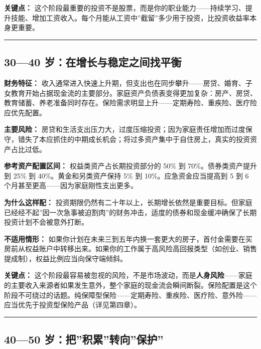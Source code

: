 \documentclass[a4paper,11pt,oneside,fontset=none,UTF8,zihao=-4]{ctexbook}
\begin{document}
\textbf{关键点：}
这个阶段最重要的投资不是股票，而是你的职业能力------持续学习、提升技能、增加工资收入。每个月能从工资中''截留''多少用于投资，比投资收益率本身更重要。

\begin{center}{\color{dh-bronze}\rule{0.2\textwidth}{0.5pt}}\end{center}

\subsection{30---40
岁：在增长与稳定之间找平衡}\label{ux5c81ux5728ux589eux957fux4e0eux7a33ux5b9aux4e4bux95f4ux627eux5e73ux8861}

\textbf{财务特征：}
收入通常进入快速上升期，但支出也在同步攀升------房贷、婚育、子女教育开始占据现金流的主要部分。家庭资产负债表变得更加复杂：房产、房贷、教育储蓄、养老准备同时存在。保险需求明显上升------定期寿险、重疾险、医疗险应优先配置。

\textbf{主要风险：}
房贷和生活支出压力大，过度压缩投资；因为家庭责任增加而过度保守，错失了本应抓住的中期成长机会；将过多资产集中于自住房上，真实的投资资产占比过低。

\textbf{参考资产配置区间：} 权益类资产占长期投资部分的 50\% 到
70\%。债券类资产提升到 25\% 到 40\%。黄金和另类资产保持 5\% 到
10\%。应急资金应当提高到 5 到 6 个月甚至更高------因为家庭刚性支出更多。

\textbf{为什么这样配：}
投资期限仍然有二十年以上，长期增长依然是重要目标。但家庭已经经不起''因一次急事被迫割肉''的财务冲击，适度的债券和现金缓冲确保了长期投资计划不会被意外打断。

\textbf{不适用情形：}
如果你计划在未来三到五年内换一套更大的房子，首付金需要在买房前从权益账户中转移出来。如果你的工作属于高风险高回报类型（如创业、销售提成制），权益比例应当向保守端倾斜。

\textbf{关键点：}
这个阶段最容易被忽视的风险，不是市场波动，而是\textbf{人身风险}------家庭的主要收入来源者如果发生意外，整个家庭的现金流会瞬间断裂。保险配置是这个阶段不可绕过的话题。纯保障型保险------定期寿险、重疾险、医疗险、意外险------应当优先于投资型保险产品（详见第四章）。

\begin{center}{\color{dh-bronze}\rule{0.2\textwidth}{0.5pt}}\end{center}

\subsection{40---50
岁：把''积累''转向''保护''}\label{ux5c81ux628aux79efux7d2fux8f6cux5411ux4fddux62a4}
\end{document}
